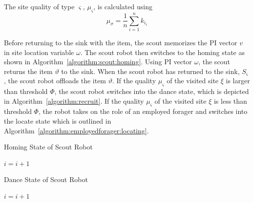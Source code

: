 The site quality of type $\varsigma$, $\mu_\varsigma$, is calculated using
\begin{equation}
\label{density}
\mu_\sigma = \frac{1}{n}\sum\limits_{i=1}^n k_{i_\varsigma}
\end{equation}
 
Before returning to the sink with the item, the scout memorizes the PI vector $v$ in site location variable $\omega$. The scout robot then switches to the homing state as shown in Algorithm~\ref{algorithm:scout:homing}. Using PI vector $\omega$, the scout returns the item $\vartheta$ to the sink. When the scout robot has returned to the sink, $S_\varsigma$, the scout robot offloads the item $\vartheta$. If the quality $\mu_\varsigma$ of the visited site $\xi$ is larger than threshold $\Phi$, the scout robot switches into the dance state, which is depicted in Algorithm~\ref{algorithm:recruit}. If the quality $\mu_\varsigma$ of the visited site $\xi$ is less than threshold $\Phi$, the robot takes on the role of an employed forager and switches into the locate state which is outlined in Algorithm~\ref{algorithm:employedforager:locating}.


\begin{algorithm}
\caption{Homing State of Scout Robot}
\label{algorithm:scout:homing}
\begin{algorithmic}[1]
	\State {}
		\State {}
	\Else 
		\State {}
		\State {}
	\EndIf
\Else
		\State {}
	\EndIf
\EndIf
\State $i =i + 1$
\EndFunction
\end{algorithmic}
\end{algorithm}


\begin{algorithm}
\caption{Dance State of Scout Robot}
\label{algorithm:recruit}
\begin{algorithmic}[1]
	\State {} 
\Else 
	\State {}
	\If {$\varrho < \rho$} 
	\Else
	\EndIf
\EndIf
\State $i =i + 1$
\EndFunction
\end{algorithmic}
\end{algorithm}

